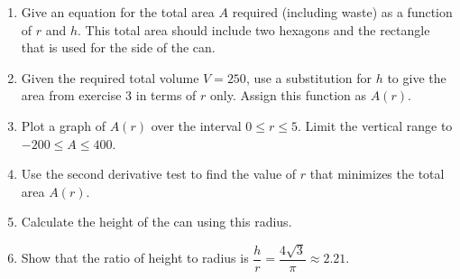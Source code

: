 \begin{enumerate}
	\item Give an equation for the total area $A$ required (including waste) as a function of $r$ and $h$. This total area should include two hexagons and the rectangle that is used for the side of the can.
	\item Given the required total volume $V=250$, use a substitution for $h$ to give the area from exercise 3 in terms of $r$ only. Assign this function as $A(r)$.
	\item Plot a graph of $A(r)$ over the interval $0 \leq r \leq 5$. Limit the vertical range to $-200 \leq A \leq  400$.
	\item Use the second derivative test to find the value of $r$ that minimizes the total area $A(r)$.
	\item Calculate the height of the can using this radius.
	\clearpage
	\item Show that the ratio of height to radius is $\dfrac{h}{r} = \dfrac{4\sqrt{3}}{\pi} \approx 2.21$.
	\end{enumerate}
